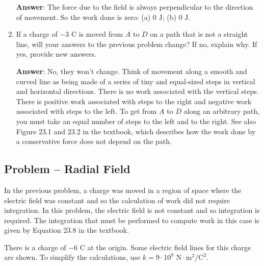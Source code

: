 \documentclass{article}
\begin{document}
\begin{enumerate}
        \ifsolutions
        {\bf Answer}: The force due to the field is always perpendicular to the direction of movement. So the work done is zero: (a) $0\text{ J}$; (b) $0 \text{ J}$.
        \else

        \vskip 48pt
        \fi

  \item If a charge of $-3\text{ C}$ is moved from $A$ to $D$ on a path that is not a straight line, will your answers to the previous problem change? If no, explain why. If yes, provide new answers.

        \ifsolutions
        {\bf Answer}: No, they won't change. Think of movement along a smooth and curved line as being made of a series of tiny and equal-sized steps in vertical and horizontal directions. There is no work associated with the vertical steps. There is positive work associated with steps to the right and negative work associated with steps to the left. To get from $A$ to $D$ along an arbitrary path, you must take an equal number of steps to the left and to the right. See also Figure 23.1 and 23.2 in the textbook, which describes how the work done by a conservative force does not depend on the path.
        \else

        \vskip 36pt
        \fi

\end{enumerate}

\newpage

\subsection{Problem -- Radial Field}

In the previous problem, a charge was moved in a region of space where the electric field was constant and so the calculation of work did not require integration. In this problem, the electric field is not constant and so integration is required. The integration that must be performed to compute work in this case is given by Equation 23.8 in the textbook.



There is a charge of $-6\text{ C}$ at the origin. Some electric field lines for this charge are shown. To simplify the calculations, use $k=9\cdot 10^9\text{ N}\cdot \text{m}^2/\text{C}^2$.
\end{document}
